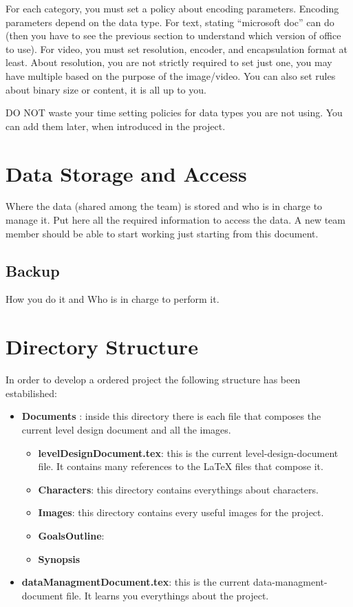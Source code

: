 \documentclass[12pt]{article}
\begin{document}
For each category, you must set a policy about encoding parameters.
Encoding parameters depend on the data type. For text, stating “microsoft doc” can do (then you have to see the previous section to understand which version of office to use). For video, you must set resolution, encoder, and encapsulation format at least. About resolution, you are not strictly required to set just one, you may have multiple based on the purpose of the image/video.
You can also set rules about binary size or content, it is all up to you.

DO NOT waste your time setting policies for data types you are not using. You can add them later, when introduced in the project.

\section{Data Storage and Access}
Where the data (shared among the team) is stored and who is in charge to manage it.
Put here all the required information to access the data. A new team member should be able to start working just starting from this document.

\subsection{Backup}
How you do it and Who is in charge to perform it.

\section{Directory Structure}
In order to develop a ordered project the following structure has been estabilished:
\begin{itemize}
\item \textbf{Documents} : inside this directory there is each file that composes the current level design document and all the images.
  \begin{itemize}
    \item \textbf{levelDesignDocument.tex}: this is the current level-design-document file. It contains many references to the LaTeX files that compose it.
    
    \item \textbf{Characters}: this directory contains everythings about characters.
      
    \item \textbf{Images}: this directory contains every useful images for the project.
      
    \item \textbf{GoalsOutline}:
    
    \item \textbf{Synopsis}
  \end{itemize}
  \item \textbf{dataManagmentDocument.tex}: this is the current data-managment-document file. It learns you everythings about the project.
\end{itemize}
\end{document}
